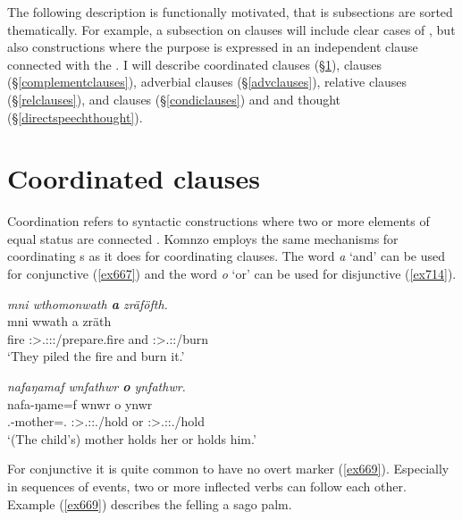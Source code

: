 The following description is functionally motivated, that is subsections are sorted thematically. For example, a subsection on  clauses will include clear cases of , but also constructions where the purpose is expressed in an independent clause connected with the . I will describe coordinated clauses (\S{}\ref{clausecoordination}),  clauses (\S{}\ref{complementclauses}), adverbial clauses (\S{}\ref{advclauses}), relative clauses (\S{}\ref{relclauses}),  and  clauses (\S{}\ref{condiclauses}) and  and thought (\S{}\ref{directspeechthought}).

\section{Coordinated clauses}\label{clausecoordination}

Coordination refers to syntactic constructions where two or more elements of equal status are connected \citep{Haspelmath:2007coordination}. Komnzo employs the same mechanisms for coordinating s as it does for coordinating clauses. The word \emph{a} `and' can be used for conjunctive  (\ref{ex667}) and the word \emph{o} `or' can be used for disjunctive  (\ref{ex714}).

\begin{exe}
	\ex \emph{mni wthomonwath \textbf{a} zräföfth.}\\
	\gll mni wwath a zräth\\
	fire \Stpl:\Sbj>\Tsg.\F:\Pst:\Pst:\Ipfv/prepare.fire and \Stpl:\Sbj>\Tsg.\F:\Irr:\Pfv/burn\\
	\trans `They piled the fire and burn it.'
	\label{ex667}
\end{exe}
\begin{exe}
	\ex \emph{nafaŋamaf wnfathwr \textbf{o} ynfathwr.}\\
	\gll nafa-ŋame=f wnwr o ynwr\\
	\Third.\Poss{}-mother=\Erg.\Sg{} \Stsg:\Sbj>\Tsg.\F:\Obj:\Nonpast.\Venit/hold or \Stsg:\Sbj>\Tsg.\Masc:\Obj:\Nonpast.\Venit/hold\\
	\trans `(The child's) mother holds her or holds him.'
	\label{ex714}
\end{exe}

For conjunctive  it is quite common to have no overt marker (\ref{ex669}). Especially in sequences of events, two or more inflected verbs can follow each other. Example (\ref{ex669}) describes the felling a sago palm.

